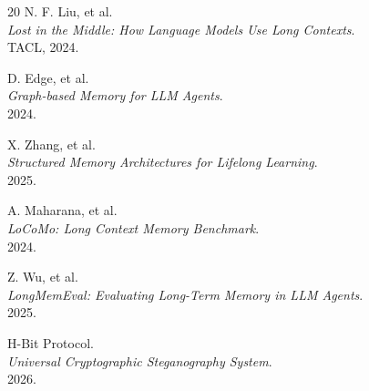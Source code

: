 \documentclass[11pt,a4paper]{article}
\begin{document}
\begin{thebibliography}{20}
N. F. Liu, et al.\\
\textit{Lost in the Middle: How Language Models Use Long Contexts}.\\
TACL, 2024.

D. Edge, et al.\\
\textit{Graph-based Memory for LLM Agents}.\\
2024.

X. Zhang, et al.\\
\textit{Structured Memory Architectures for Lifelong Learning}.\\
2025.

A. Maharana, et al.\\
\textit{LoCoMo: Long Context Memory Benchmark}.\\
2024.

Z. Wu, et al.\\
\textit{LongMemEval: Evaluating Long-Term Memory in LLM Agents}.\\
2025.

H-Bit Protocol.\\
\textit{Universal Cryptographic Steganography System}.\\
2026.

\end{thebibliography}
\end{document}
